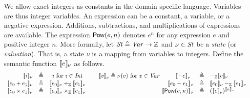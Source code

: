 We allow exact integers as constants in the domain specific
language. Variables are thus integer variables. An expression can be a
constant, a variable, or a negative expression. Additions, subtractions,
and multiplications of expressions are available. The expression
$\mbox{\textsf{Pow}}(e, n)$ denotes $e^n$ for any expression $e$ and positive
integer $n$. More formally, let $\mathit{St} \triangleq \mathit{Var} \rightarrow
\mathbb{Z}$ and $\nu \in \mathit{St}$ be a \emph{state} (or \emph{valuation}). That is,
a {state} $\nu$ is a mapping from variables to integers. Define the
semantic function $[\![{e}]\!]_{\nu}$ as follows.
\[
\begin{array}{rclcrcl}
  \valueof{{i}}_{\nu} & \defn & 
  \multicolumn{3}{c}{
    \begin{array}{lcccr}
      i \textmd{  for ${i} \in \Int$} 
      & \hspace{.02\columnwidth} &
      \valueof{{v}}_{\nu} \defn \nu({v}) 
      \textmd{  for ${v} \in \Var$}
      & \hspace{.02\columnwidth} &
      \valueof{-e}_{\nu} 
    \end{array}
  }
  & \defn & -_{\bbfZ}\valueof{e}_{\nu}
  \\
  \valueof{e_0 + e_1}_{\nu} & \defn & 
     \valueof{e_0}_{\nu} +_{\bbfZ} \valueof{e_1}_{\nu}
  & \hspace{.1\columnwidth} &
  \valueof{e_0 - e_1}_{\nu} & \defn & 
     \valueof{e_0}_{\nu} -_{\bbfZ} \valueof{e_1}_{\nu}\\
  \valueof{e_0 \times e_1}_{\nu} & \defn & 
     \valueof{e_0}_{\nu} \times_{\bbfZ} \valueof{e_1}_{\nu}
  &&
  \valueof{\dslcode{Pow}(e, n)}_{\nu} & \defn & 
     (\valueof{e}_{\nu})^{\valueof{n}_{\nu}}
\end{array}
\]

